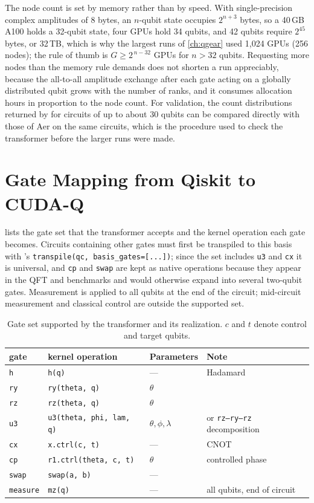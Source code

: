 The node count is set by memory rather than by speed. With single-precision complex amplitudes of 8 bytes, an $n$-qubit state occupies $2^{n+3}$ bytes, so a 40\,GB A100 holds a 32-qubit state, four GPUs hold 34 qubits, and 42 qubits require $2^{45}$ bytes, or 32\,TB, which is why the largest runs of \cref{ch:qgear} used 1,024 GPUs (256 nodes); the rule of thumb is $G \geq 2^{\,n-32}$ GPUs for $n>32$ qubits. Requesting more nodes than the memory rule demands does not shorten a run appreciably, because the all-to-all amplitude exchange after each gate acting on a globally distributed qubit grows with the number of ranks, and it consumes allocation hours in proportion to the node count. For validation, the count distributions returned by \cudaq{} for circuits of up to about 30 qubits can be compared directly with those of \qiskit{} Aer on the same circuits, which is the procedure used to check the transformer before the larger runs were made.

\section{Gate Mapping from Qiskit to CUDA-Q}\label{sec:appqgear:gates}

 lists the gate set that the transformer accepts and the \cudaq{} kernel operation each gate becomes. Circuits containing other gates must first be transpiled to this basis with \qiskit{}'s \texttt{transpile(qc, basis\_gates=[...])}; since the set includes \texttt{u3} and \texttt{cx} it is universal, and \texttt{cp} and \texttt{swap} are kept as native operations because they appear in the QFT and \qcrank{} benchmarks and would otherwise expand into several two-qubit gates. Measurement is applied to all qubits at the end of the circuit; mid-circuit measurement and classical control are outside the supported set.

\begin{table}[htbp]
\caption{Gate set supported by the \qgear{} transformer and its \cudaq{} realization. $c$ and $t$ denote control and target qubits.}
\label{tab:appqgear:gates}
\centering
\begingroup\singlespacing\footnotesize
\begin{tabular}{@{}llll@{}}
\toprule
\qiskit{} gate & \cudaq{} kernel operation & Parameters & Note \\
\midrule
\texttt{h} & \texttt{h(q)} & --- & Hadamard \\
\texttt{ry} & \texttt{ry(theta, q)} & $\theta$ & \\
\texttt{rz} & \texttt{rz(theta, q)} & $\theta$ & \\
\texttt{u3} & \texttt{u3(theta, phi, lam, q)} & $\theta,\phi,\lambda$ & or \texttt{rz--ry--rz} decomposition \\
\texttt{cx} & \texttt{x.ctrl(c, t)} & --- & CNOT \\
\texttt{cp} & \texttt{r1.ctrl(theta, c, t)} & $\theta$ & controlled phase \\
\texttt{swap} & \texttt{swap(a, b)} & --- & \\
\texttt{measure} & \texttt{mz(q)} & --- & all qubits, end of circuit \\
\bottomrule
\end{tabular}
\endgroup
\end{table}
